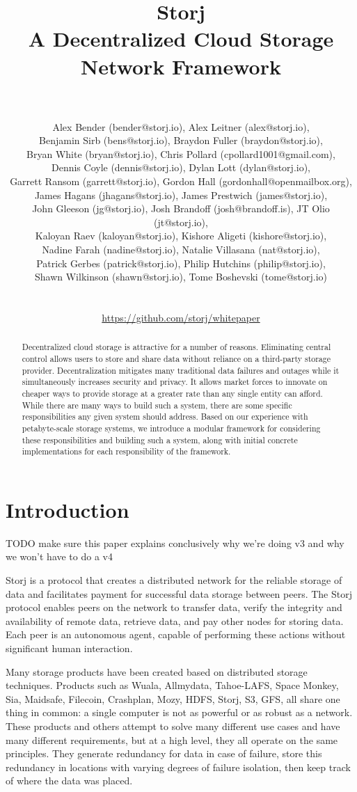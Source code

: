 \documentclass[a4paper,10pt]{article} \usepackage[utf8]{inputenc}
\title{\textbf{Storj\\A Decentralized Cloud Storage Network Framework}}
\author{\\ \parbox{\linewidth}{\centering\small Alex Bender (bender@storj.io),
Alex Leitner (alex@storj.io),\\ Benjamin Sirb (bens@storj.io), Braydon Fuller
(braydon@storj.io),\\ Bryan White (bryan@storj.io), Chris Pollard
(cpollard1001@gmail.com),\\ Dennis Coyle (dennis@storj.io), Dylan Lott
(dylan@storj.io),\\ Garrett Ransom (garrett@storj.io), Gordon Hall
(gordonhall@openmailbox.org),\\ James Hagans (jhagans@storj.io), James Prestwich
(james@storj.io),\\ John Gleeson (jg@storj.io), Josh Brandoff
(josh@brandoff.is), JT Olio (jt@storj.io),\\ Kaloyan Raev (kaloyan@storj.io),
Kishore Aligeti (kishore@storj.io),\\ Nadine Farah (nadine@storj.io), Natalie
Villasana (nat@storj.io),\\ Patrick Gerbes (patrick@storj.io), Philip Hutchins
(philip@storj.io),\\ Shawn Wilkinson (shawn@storj.io), Tome Boshevski
(tome@storj.io)}\\ \\ \small \url{https://github.com/storj/whitepaper} } \date
\newcommand{\todo}[1]{{\color{red} TODO #1}}
\begin{document}
 \maketitle

\begin{abstract} Decentralized cloud storage is attractive for a number of
reasons. Eliminating central control allows users to store and share data
without reliance on a third-party storage provider. Decentralization mitigates
many traditional data failures and outages while it simultaneously increases
security and privacy. It allows market forces to innovate on cheaper ways to
provide storage at a greater rate than any single entity can afford. While there
are many ways to build such a system, there are some specific responsibilities
any given system should address. Based on our experience with petabyte-scale
storage systems, we introduce a modular framework for considering these
responsibilities and building such a system, along with initial concrete
implementations for each responsibility of the framework. \end{abstract}

\section{Introduction}

\todo{make sure this paper explains conclusively why we're doing v3 and why
we won't have to do a v4}

Storj is a protocol that creates a distributed network for the reliable storage
of data and facilitates payment for successful data storage between peers. The
Storj protocol enables peers on the network to transfer data, verify the
integrity and availability of remote data, retrieve data, and pay other nodes
for storing data. Each peer is an autonomous agent, capable of performing these
actions without significant human interaction.

Many storage products have been created based on distributed storage techniques.
Products such as Wuala, Allmydata, Tahoe-LAFS, Space Monkey, Sia, Maidsafe,
Filecoin, Crashplan, Mozy, HDFS, Storj, S3, GFS, all share one thing in common:
a single computer is not as powerful or as robust as a network. These products
and others attempt to solve many different use cases and have many different
requirements, but at a high level, they all operate on the same principles. They
generate redundancy for data in case of failure, store this redundancy in
locations with varying degrees of failure isolation, then keep track of where
the data was placed.
\end{document}
